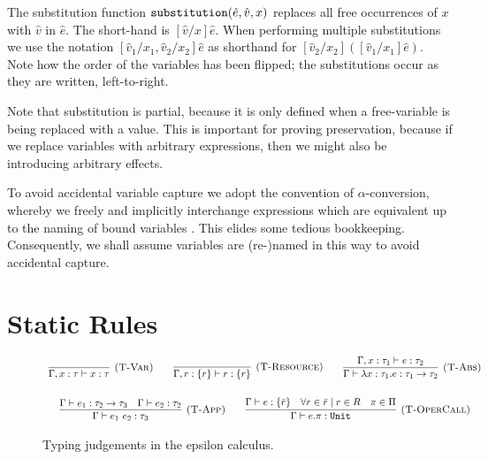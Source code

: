 \noindent
The substitution function $\mathtt{substitution}(\hat e, \hat v, x)$ replaces all free occurrences of $x$ with $\hat v$ in $\hat e$. The short-hand is $[\hat v/x]\hat e$. When performing multiple substitutions we use the notation $[\hat v_1/x_1, \hat v_2/x_2]\hat e$ as shorthand for $[\hat v_2/x_2]([\hat v_1/x_1]\hat e)$. Note how the order of the variables has been flipped; the substitutions occur as they are written, left-to-right.

Note that substitution is partial, because it is only defined when a free-variable is being replaced with a value. This is important for proving preservation, because if we replace variables with arbitrary expressions, then we might also be introducing arbitrary effects.

To avoid accidental variable capture we adopt the convention of $\alpha$-conversion, whereby we freely and implicitly interchange expressions which are equivalent up to the naming of bound variables \cite[p. 71]{tapl}. This elides some tedious bookkeeping. Consequently, we shall assume variables are (re-)named in this way to avoid accidental capture.



\section{Static Rules}

\begin{figure}[h]


\[
\begin{array}{c}


\infer[\textsc{(T-Var)}]
	{\Gamma, x: \tau \vdash x: \tau}
	{}
~~~~~~
\infer[\textsc{(T-Resource)}]
	{\Gamma, r: \{ r \} \vdash r : \{ r \}}
	{}

~~~~~~
\infer[\textsc{(T-Abs)}]
	{\Gamma \vdash \lambda x: \tau_1.e : \tau_1 \rightarrow \tau_2}
	{\Gamma, x: \tau_1 \vdash e: \tau_2}\\[4ex]
	
\infer[\textsc{(T-App)}]
	{\Gamma \vdash e_1~e_2: \tau_3}
	{\Gamma \vdash e_1: \tau_2 \rightarrow \tau_3 & \Gamma \vdash e_2: \tau_2}
~~~~~~
\infer[\textsc{(T-OperCall)}]
	{\Gamma \vdash e.\pi: \kwa{Unit}}
	{\Gamma \vdash e: \{ \bar r \} & \forall r \in \bar r \mid r \in R & \pi \in \Pi}

\end{array}
\]

\vspace{-7pt}
\caption{Typing judgements in the epsilon calculus.}
\label{This is the label.}
\end{figure}


